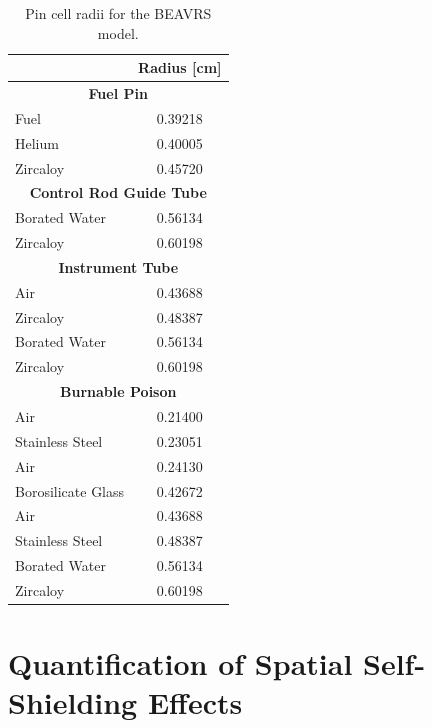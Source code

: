 \begin{appendices}
\renewcommand{\arraystretch}{0.9}
\begin{table}[h!]
  \centering
  \caption[BEAVRS pin cell radii]{Pin cell radii for the \ac{BEAVRS} model.}
  \small
  \label{table:app-pin-cell-radii} 
  \vspace{6pt}
  \begin{tabular}{l c}
  \toprule
  \rowcolor{lightgray}
  \multicolumn{1}{c}{\bf Material} &
  \multicolumn{1}{c}{\bf Radius [cm]} \\
  \midrule
  \multicolumn{2}{c}{\bf Fuel Pin} \\
  \midrule
  Fuel &  0.39218 \\
  Helium & 0.40005 \\
  Zircaloy & 0.45720 \\
  \midrule
  \multicolumn{2}{c}{\bf Control Rod Guide Tube} \\
  \midrule
  Borated Water & 0.56134 \\
  Zircaloy & 0.60198 \\
  \midrule
  \multicolumn{2}{c}{\bf Instrument Tube} \\
  \midrule
  Air & 0.43688 \\
  Zircaloy & 0.48387 \\
  Borated Water & 0.56134 \\
  Zircaloy & 0.60198 \\
  \midrule
  \multicolumn{2}{c}{\bf Burnable Poison} \\
  \midrule
  Air & 0.21400 \\
  Stainless Steel & 0.23051 \\
  Air & 0.24130 \\
  Borosilicate Glass & 0.42672 \\
  Air & 0.43688 \\
  Stainless Steel & 0.48387 \\
  Borated Water & 0.56134 \\
  Zircaloy & 0.60198 \\
  \bottomrule
\end{tabular}
\end{table}


\chapter{Quantification of Spatial Self-Shielding Effects}
\label{app:quantify-mgxs-shielding}



\end{appendices}
